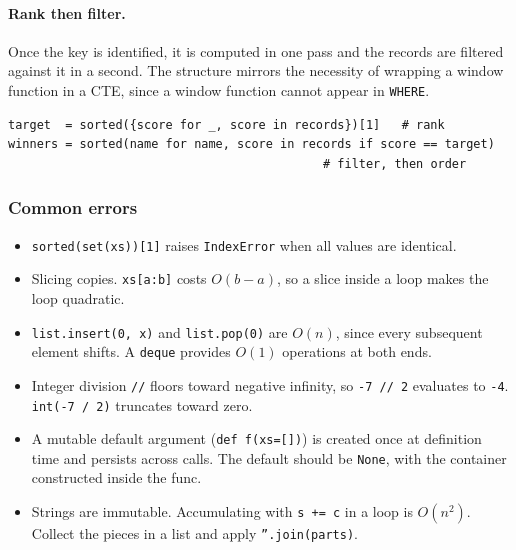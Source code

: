 \paragraph{Rank then filter.} Once the key is identified, it is computed in
one pass and the records are filtered against it in a second. The structure
mirrors the necessity of wrapping a window function in a CTE, since a window
function cannot appear in \texttt{WHERE}.

\begin{lstlisting}[style=python, caption={Rank then filter}]
target  = sorted({score for _, score in records})[1]   # rank
winners = sorted(name for name, score in records if score == target)
                                            # filter, then order
\end{lstlisting}

\vspace{-3ex}

\subsubsection*{Common errors}

\begin{itemize}
  \item \texttt{sorted(set(xs))[1]} raises \texttt{IndexError} when all values
        are identical.
  \item Slicing copies. \texttt{xs[a:b]} costs $O(b-a)$, so a slice inside a
        loop makes the loop quadratic.
  \item \texttt{list.insert(0, x)} and \texttt{list.pop(0)} are $O(n)$, since
        every subsequent element shifts. A \texttt{deque} provides $O(1)$
        operations at both ends.
  \item Integer division \texttt{//} floors toward negative infinity, so
        \texttt{-7 // 2} evaluates to \texttt{-4}. \texttt{int(-7 / 2)}
        truncates toward zero.
  \item A mutable default argument (\texttt{def f(xs=[])}) is created once at
        definition time and persists across calls. The default should be
        \texttt{None}, with the container constructed inside the func.
  \item Strings are immutable. Accumulating with \texttt{s += c} in a loop is
        $O(n^2)$. Collect the pieces in a list and apply
        \texttt{''.join(parts)}.
\end{itemize}
